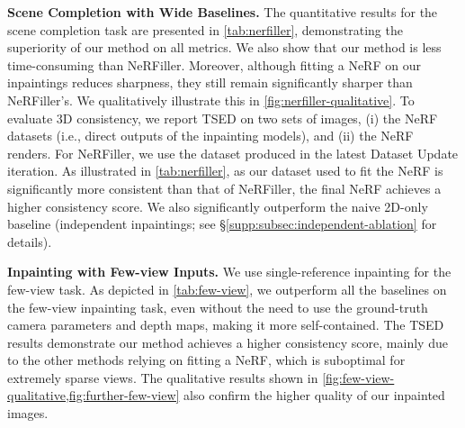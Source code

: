\noindent\textbf{Scene Completion with Wide Baselines.} 
The quantitative results for the scene completion task are presented in \cref{tab:nerfiller}, demonstrating the superiority of our method on all metrics. We also show that our method is less time-consuming than NeRFiller.
Moreover,
although fitting a NeRF 
on our inpaintings
reduces sharpness,
they
still
remain significantly sharper than
NeRFiller's.
We qualitatively illustrate this in \cref{fig:nerfiller-qualitative}.
To evaluate 3D consistency, we report TSED on two sets of images, (i) the NeRF datasets (i.e., direct outputs of the inpainting models), and (ii) the NeRF renders. For NeRFiller, we use the dataset produced in the latest Dataset Update iteration. As illustrated in 
\cref{tab:nerfiller},
as our dataset used to fit the NeRF is significantly more consistent than that of NeRFiller, the final NeRF achieves a higher consistency score.
We also significantly outperform the naive 2D-only baseline (independent inpaintings; see \S\ref{supp:subsec:independent-ablation} for details).



    

    

\noindent\textbf{Inpainting with Few-view Inputs.}
We use single-reference inpainting for the few-view task. As depicted in \cref{tab:few-view}, we outperform all the baselines on the few-view inpainting task,
even without the need to use
the ground-truth camera parameters and depth maps,
making it more self-contained.
The TSED results demonstrate our method achieves a higher consistency score, mainly due to the other methods relying on fitting a NeRF, which is suboptimal for extremely sparse views. The qualitative results shown in \cref{fig:few-view-qualitative,fig:further-few-view} also confirm the higher quality of our inpainted images.

